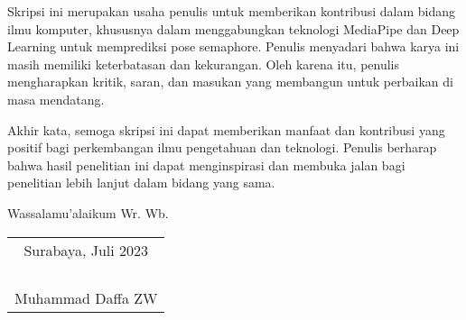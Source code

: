   Skripsi ini merupakan usaha penulis untuk memberikan kontribusi dalam bidang ilmu komputer, khususnya dalam menggabungkan teknologi MediaPipe dan Deep Learning untuk memprediksi pose semaphore. Penulis menyadari bahwa karya ini masih memiliki keterbatasan dan kekurangan. Oleh karena itu, penulis mengharapkan kritik, saran, dan masukan yang membangun untuk perbaikan di masa mendatang.

  Akhir kata, semoga skripsi ini dapat memberikan manfaat dan kontribusi yang positif bagi perkembangan ilmu pengetahuan dan teknologi. Penulis berharap bahwa hasil penelitian ini dapat menginspirasi dan membuka jalan bagi penelitian lebih lanjut dalam bidang yang sama.

Wassalamu'alaikum Wr. Wb.
  
  \begin{flushright}
    \begin{tabular}[b]{c}
      Surabaya, Juli 2023 \\
      \\
      \\
      \\
      \\
      Muhammad Daffa ZW
    \end{tabular}
  \end{flushright}